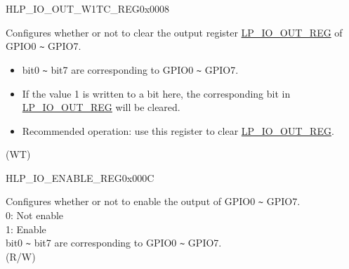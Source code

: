 \begin{register}{H}{LP\_IO\_OUT\_W1TC\_REG}{0x0008}\label{regdesc:LPIOOUTW1TCREG}
%
%
\regnewline%
\begin{regdesc}\begin{reglist}
\label{fielddesc:LPIOOUTDATAW1TC}\item [LP\_GPIO\_OUT\_DATA\_W1TC] Configures whether or not to clear the output register \hyperref[regdesc:LPIOOUTREG]{LP\_IO\_OUT\_REG} of GPIO0 \verb+~+ GPIO7.\\
\begin{itemize}
    \item bit0 \verb+~+ bit7 are corresponding to GPIO0 \verb+~+ GPIO7.
    \item If the value 1 is written to a bit here, the corresponding bit in \hyperref[regdesc:LPIOOUTREG]{LP\_IO\_OUT\_REG} will be cleared.
    \item Recommended operation: use this register to clear \hyperref[regdesc:LPIOOUTREG]{LP\_IO\_OUT\_REG}. \end{itemize} (WT)
\end{reglist}\end{regdesc}
\end{register}


\begin{register}{H}{LP\_IO\_ENABLE\_REG}{0x000C}\label{regdesc:LPIOENABLEREG}
%
%
\regnewline%
\begin{regdesc}\begin{reglist}
\label{fielddesc:LPGPIOENABLE}\item [LP\_GPIO\_ENABLE] Configures whether or not to enable the output of GPIO0 \verb+~+ GPIO7.\\
0: Not enable\\
1: Enable\\
bit0 \verb+~+ bit7 are corresponding to GPIO0 \verb+~+ GPIO7.\\
 (R/W)
\end{reglist}\end{regdesc}
\end{register}


